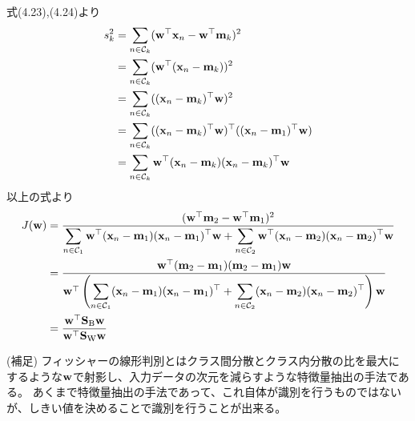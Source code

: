 \documentclass{jsarticle}
\begin{document}
式(4.23),(4.24)より
\begin{align*}
    s_k^2
    &=\sum_{n\in{\mathcal C}_k}({\bf w}^\top{\bf x}_n-{\bf w}^\top{\bf m}_k)^2\\
    &=\sum_{n\in{\mathcal C}_k}({\bf w}^\top({\bf x}_n-{\bf m}_k))^2\\
    &=\sum_{n\in{\mathcal C}_k}( ({\bf x}_n-{\bf m}_k) ^\top{\bf w})^2\\
    &=\sum_{n\in{\mathcal C}_k}( ({\bf x}_n-{\bf m}_k) ^\top{\bf w})^\top( ({\bf x}_n-{\bf m}_1) ^\top{\bf w})\\
    &=\sum_{n\in{\mathcal C}_k}{\bf w}^\top({\bf x}_n-{\bf m}_k)({\bf x}_n-{\bf m}_k) ^\top{\bf w}
    \end{align*}
以上の式より
\begin{align*}
    J({\bf w})
    &=\frac{({\bf w}^\top{\bf m}_2-{\bf w}^\top{\bf m}_1)^2}{\displaystyle\sum_{n\in{\mathcal C}_1}{\bf w}^\top({\bf x}_n-{\bf m}_1)({\bf x}_n-{\bf m}_1) ^\top{\bf w}+\displaystyle\sum_{n\in{\mathcal C}_2}{\bf w}^\top({\bf x}_n-{\bf m}_2)({\bf x}_n-{\bf m}_2) ^\top{\bf w}}\\
    &=\frac{{\bf w}^\top({\bf m}_2-{\bf m}_1)({\bf m}_2-{\bf m}_1){\bf w}}{{\bf w}^\top\left(\displaystyle\sum_{n\in{\mathcal C}_1}({\bf x}_n-{\bf m}_1)({\bf x}_n-{\bf m}_1) ^\top+\displaystyle\sum_{n\in{\mathcal C}_2}({\bf x}_n-{\bf m}_2)({\bf x}_n-{\bf m}_2) ^\top\right){\bf w}}\\
    &=\frac{{\bf w}^\top{\bf S}_{\rm B}{\bf w}}{{\bf w}^\top{\bf S}_{\rm W}{\bf w}}
    \end{align*}

(補足)
フィッシャーの線形判別とはクラス間分散とクラス内分散の比を最大にするような$\bf w$で射影し、入力データの次元を減らすような特徴量抽出の手法である。
あくまで特徴量抽出の手法であって、これ自体が識別を行うものではないが、しきい値を決めることで識別を行うことが出来る。 \\
\end{document}
